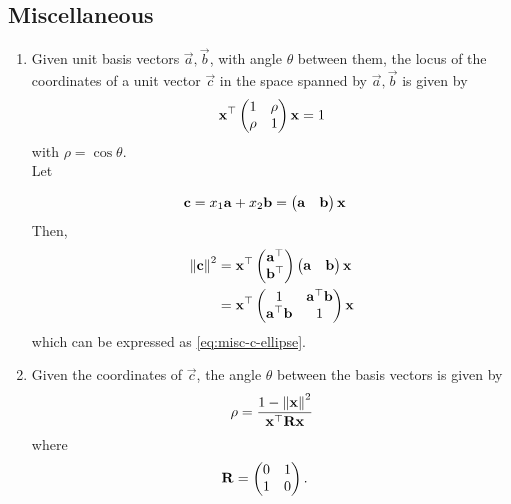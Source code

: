 \documentclass[journal,12pt,onecolumn]{IEEEtran}
\renewcommand\thesection{\arabic{section}}
\begin{document}
\subsection{Miscellaneous}
\renewcommand{\theequation}{\theenumi}
\begin{enumerate}[label=\thesection.\arabic*.,ref=\thesection.\theenumi]
\item  Given unit basis vectors $\vec{a}, \vec{b}$, with angle	$\theta $ between them, the locus of the coordinates of a unit vector $\vec{c}$ in the space spanned by $\vec{a}, \vec{b}$  is given by 
		\begin{align}
\mathbf{x}^{\top}  \begin{pmatrix}1 & \rho \\ \rho & 1\end{pmatrix}\mathbf{x} = 1
			\label{eq:misc-c-ellipse}
		\end{align}
			with $\rho = \cos \theta $.
\\
		\solution Let 

		\begin{align}
			\mathbf{c}& =x_1\mathbf{a}+ x_2\mathbf{b} = \begin{pmatrix}\mathbf{a} & \mathbf{b}\end{pmatrix}\mathbf{x}
		\end{align}
		Then, 
		\begin{align}
		\left\lVert\mathbf{c}\right\rVert^2 &= \mathbf{x}^{\top}\begin{pmatrix}\mathbf{a}^{\top} \\ \mathbf{b}^{\top}\end{pmatrix}\begin{pmatrix}\mathbf{a} & \mathbf{b}\end{pmatrix}\mathbf{x}
\\
			&= \mathbf{x}^{\top}\begin{pmatrix}1 & \mathbf{a}^{\top} \mathbf{b} \\ \mathbf{a}^{\top}\mathbf{b}& 1\end{pmatrix}\mathbf{x}
		\end{align}
			which can be expressed as 
			\eqref{eq:misc-c-ellipse}.
		\item Given the coordinates of $\vec{c}$, the angle $\theta$ between the  basis vectors 
			is given by
		\begin{align}
			\rho 
			= \frac{1 - \left\lVert\mathbf{x}\right\rVert^2}{\mathbf{x}^{\top}\mathbf{R}\mathbf{x}}
			\label{eq:misc-c-ellipse-d-rho-final}
		\end{align}
		where 
		\begin{align}
			\mathbf{R}	&= \begin{pmatrix}0 & 1 \\ 1 & 0\end{pmatrix}.
		\end{align}


\end{enumerate}
\end{document}
